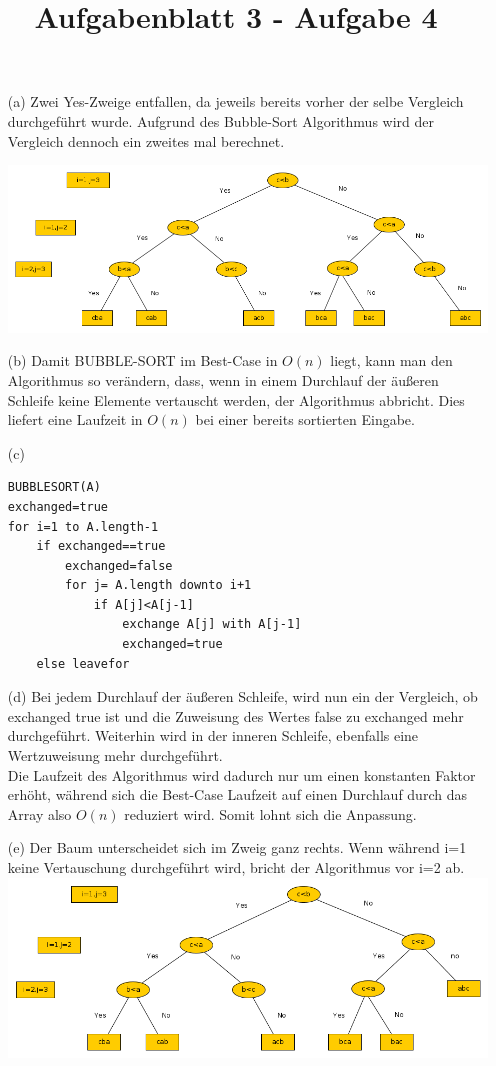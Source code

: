 \documentclass{article}
\title{Aufgabenblatt 3 - Aufgabe 4}
\author{}
\begin{document}
\maketitle

\begin{enumerate}
\item[(a)]Zwei Yes-Zweige entfallen, da jeweils bereits vorher der selbe Vergleich durchgef\"uhrt wurde. Aufgrund des Bubble-Sort Algorithmus wird der Vergleich dennoch ein zweites mal berechnet.\\
\begin{center}
\includegraphics[scale=0.4]{4aGraph.png}\\
\end{center}
\item[(b)]
Damit BUBBLE-SORT im Best-Case in $O(n)$ liegt, kann man den Algorithmus so verändern, dass, wenn in einem Durchlauf der \"au{\ss}eren Schleife keine Elemente vertauscht werden, der Algorithmus abbricht. Dies liefert eine Laufzeit in $O(n)$ bei einer bereits sortierten Eingabe.
\item[(c)]
\begin{lstlisting}
BUBBLESORT(A)
exchanged=true
for i=1 to A.length-1
	if exchanged==true
		exchanged=false
		for j= A.length downto i+1
			if A[j]<A[j-1]
				exchange A[j] with A[j-1]
				exchanged=true
	else leavefor
\end{lstlisting}
\item[(d)]
Bei jedem Durchlauf der \"außeren Schleife, wird nun ein der Vergleich, ob exchanged true ist und die Zuweisung des Wertes false zu exchanged mehr durchgef\"uhrt. Weiterhin wird in der inneren Schleife, ebenfalls eine Wertzuweisung mehr durchgef\"uhrt. \\
Die Laufzeit des Algorithmus wird dadurch nur um einen konstanten Faktor erh\"oht, w\"ahrend sich die Best-Case Laufzeit auf einen Durchlauf durch das Array also $O(n)$ reduziert wird. Somit lohnt sich die Anpassung.
\item[(e)]
Der Baum unterscheidet sich im Zweig ganz rechts. Wenn w\"ahrend i=1 keine Vertauschung durchgef\"uhrt wird, bricht der Algorithmus vor i=2 ab. \\
\includegraphics[scale=0.4]{4eGraph.png}\\
\end{enumerate}
\end{document}
